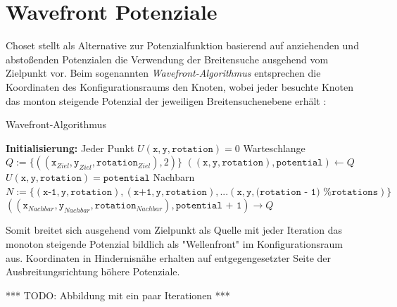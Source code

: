 \section{Wavefront Potenziale}

Choset stellt als Alternative zur Potenzialfunktion basierend auf anziehenden und abstoßenden Potenzialen die Verwendung der Breitensuche ausgehend vom Zielpunkt vor. Beim sogenannten \textit{Wavefront-Algorithmus} entsprechen die Koordinaten des Konfigurationsraums den Knoten, wobei jeder besuchte Knoten das monton steigende Potenzial der jeweiligen Breitensuchenebene erhält \cite{choset.2007}:

\begin{algorithm}
\caption{Wavefront-Algorithmus}
\begin{algorithmic}[1]
    \State \textbf{Initialisierung:}
    \State \hspace{\algorithmicindent} Jeder Punkt $U(\texttt{x}, \texttt{y}, \texttt{rotation}) = 0$
    \State \hspace{\algorithmicindent} Warteschlange $Q := \{((\texttt{x}_{Ziel}, \texttt{y}_{Ziel}, \texttt{rotation}_{Ziel}), 2)\}$
	\vspace*{0.5cm}
        \State $((\texttt{x}, \texttt{y}, \texttt{rotation}), \texttt{potential}) \gets Q$
        \State $U(\texttt{x}, \texttt{y}, \texttt{rotation}) = \texttt{potential}$
        \State Nachbarn $N := \{(\texttt{x-1}, \texttt{y}, \texttt{rotation}), (\texttt{x+1}, \texttt{y}, \texttt{rotation}), ... (\texttt{x}, \texttt{y}, \texttt{(rotation - 1) \% rotations})\}$
                \State $((\texttt{x}_{Nachbar}, \texttt{y}_{Nachbar}, \texttt{rotation}_{Nachbar}), \texttt{potential + 1}) \rightarrow Q$
            \EndIf
        \EndFor
    \EndWhile
\end{algorithmic}
\end{algorithm}

Somit breitet sich ausgehend vom Zielpunkt als Quelle mit jeder Iteration das monoton steigende Potenzial bildlich als "Wellenfront" im Konfigurationsraum aus.
Koordinaten in Hindernisnähe erhalten auf entgegengesetzter Seite der Ausbreitungsrichtung höhere Potenziale.

*** TODO: Abbildung mit ein paar Iterationen ***



